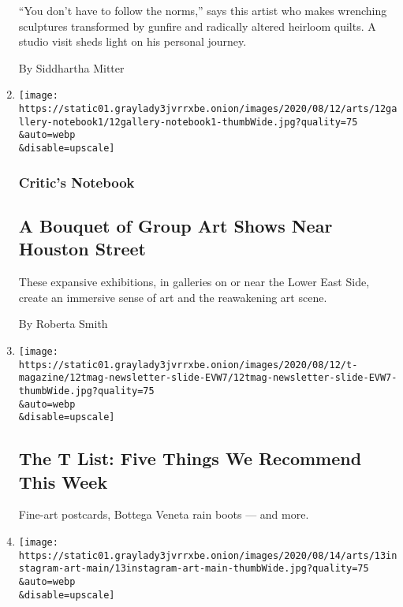 \begin{enumerate}
  ``You don't have to follow the norms,'' says this artist who makes
  wrenching sculptures transformed by gunfire and radically altered
  heirloom quilts. A studio visit sheds light on his personal journey.

  By Siddhartha Mitter
\item
  \href{/2020/08/13/arts/design/nyc-galleries-art-shows.html}{}

  \texttt{[image: https://static01.graylady3jvrrxbe.onion/images/2020/08/12/arts/12gallery-notebook1/12gallery-notebook1-thumbWide.jpg?quality=75\\\&auto=webp\\\&disable=upscale]}

  \hypertarget{critics-notebook}{%
  \subsubsection{Critic's Notebook}\label{critics-notebook}}

  \hypertarget{a-bouquet-of-group-art-shows-near-houston-street}{%
  \subsection{A Bouquet of Group Art Shows Near Houston
  Street}\label{a-bouquet-of-group-art-shows-near-houston-street}}

  These expansive exhibitions, in galleries on or near the Lower East
  Side, create an immersive sense of art and the reawakening art scene.

  By Roberta Smith
\item
  \href{/2020/08/13/t-magazine/inque-postcards-rain-boots.html}{}

  \texttt{[image: https://static01.graylady3jvrrxbe.onion/images/2020/08/12/t-magazine/12tmag-newsletter-slide-EVW7/12tmag-newsletter-slide-EVW7-thumbWide.jpg?quality=75\\\&auto=webp\\\&disable=upscale]}

  \hypertarget{the-t-list-five-things-we-recommend-this-week-1}{%
  \subsection{The T List: Five Things We Recommend This
  Week}\label{the-t-list-five-things-we-recommend-this-week-1}}

  Fine-art postcards, Bottega Veneta rain boots --- and more.
\item
  \href{/2020/08/12/arts/design/instagram-art-accounts-to-follow.html}{}

  \texttt{[image: https://static01.graylady3jvrrxbe.onion/images/2020/08/14/arts/13instagram-art-main/13instagram-art-main-thumbWide.jpg?quality=75\\\&auto=webp\\\&disable=upscale]}


\end{enumerate}
